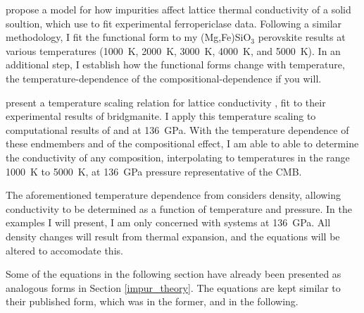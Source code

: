 \citet{Padture1997} propose a model for how impurities affect lattice thermal conductivity of a solid soultion, which \citet{Ohta2017} use to fit experimental ferropericlase data. Following a similar methodology, I fit the functional form to my (Mg,Fe)SiO$_3$ perovskite results at various temperatures (1000~K, 2000~K, 3000~K, 4000~K, and 5000~K). In an additional step, I establish how the functional forms change with temperature, the temperature-dependence of the compositional-dependence if you will.

\citet{Okuda2017} present a temperature scaling relation for lattice conductivity \citep[originally from][]{Manthilake2011}, fit to their experimental results of bridgmanite. I apply this temperature scaling to computational results of \mgsios and \fesios at 136~GPa. With the temperature dependence of these endmembers and of the compositional effect, I am able to able to determine the conductivity of any composition, interpolating to temperatures in the range 1000~K to 5000~K, at 136~GPa pressure representative of the CMB.

The aforementioned temperature dependence from \citet{Manthilake2011} considers density, allowing conductivity to be determined as a function of temperature and pressure. In the examples I will present, I am only concerned with systems at 136~GPa. All density changes will result from thermal expansion, and the equations will be altered to accomodate this.

Some of the equations in the following section have already been presented as analogous forms in Section \ref{impur_theory}. The equations are kept similar to their published form, which was \citet{Stackhouse2015} in the former, and \citet{Ohta2017, Okuda2017} in the following.

